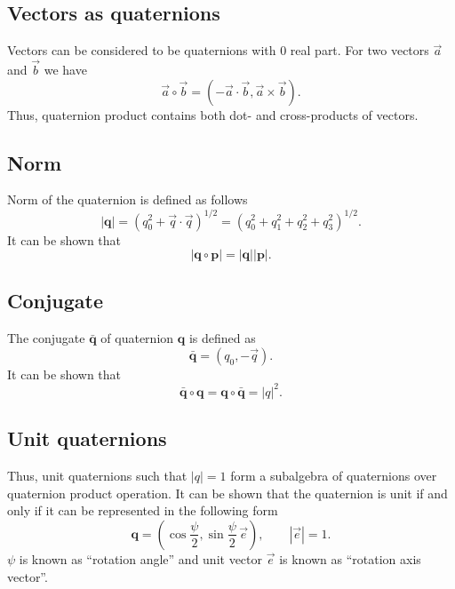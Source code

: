 \subsection{Vectors as quaternions}

Vectors can be considered to be quaternions with 0 real part. For two
vectors $\vec{a}$ and $\vec{b}$ we have
\begin{equation}
  \vec{a}\circ\vec{b} = ( -\vec{a}\cdot\vec{b}, \vec{a}\times\vec{b} ).
\end{equation}
Thus, quaternion product contains both dot- and cross-products of
vectors.

\subsection{Norm}

Norm of the quaternion is defined as follows
\begin{equation}
  |\bm{q}| = \left( q_0^2 + \vec{q}\cdot\vec{q} \right)^{1/2} = 
  \left( q_0^2 + q_1^2 + q_2^2 + q_3^2 \right)^{1/2}.
\end{equation}
It can be shown that
\begin{equation}
  |\bm{q}\circ\bm{p}| = |\bm{q}||\bm{p}|.
\end{equation}

\subsection{Conjugate}

The conjugate $\bm{\bar{q}}$ of quaternion $\bm{q}$ is defined as
\begin{equation}
  \bm{\bar{q}} = (q_0, -\vec{q}).
\end{equation}
It can be shown that
\begin{equation}
\bm{\bar{q}}\circ\bm{q} = \bm{q}\circ\bm{\bar{q}} = |q|^2.
\end{equation}

\subsection{Unit quaternions}

Thus, unit quaternions such that $|q|=1$ form a subalgebra of
quaternions over quaternion product operation. It can be shown that
the quaternion is unit if and only if it can be represented in the
following form
\begin{equation}
  \bm{q} = \left( \cos\frac{\psi}{2}, \sin\frac{\psi}{2}\,\vec{e}
  \right), \qquad |\vec{e}|=1.
\end{equation}
$\psi$ is known as ``rotation angle'' and unit vector $\vec{e}$ is
known as ``rotation axis vector''.

